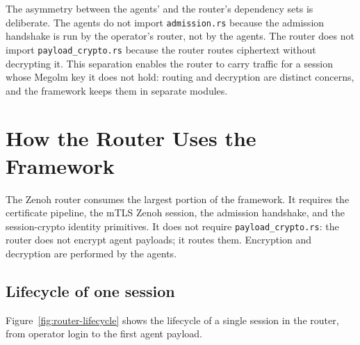 \documentclass[11pt,a4paper]{article}
\begin{document}
The asymmetry between the agents' and the router's dependency
sets is deliberate. The agents do not import
\texttt{admission.rs} because the admission handshake is run by
the operator's router, not by the agents. The router does not
import \texttt{payload\_crypto.rs} because the router routes
ciphertext without decrypting it. This separation enables the
router to carry traffic for a session whose Megolm key it does
not hold: routing and decryption are distinct concerns, and the
framework keeps them in separate modules.

\section{How the Router Uses the Framework}
\label{sec:howRouterUses}

The Zenoh router consumes the largest portion of the framework.
It requires the certificate pipeline, the mTLS Zenoh session, the
admission handshake, and the session-crypto identity primitives.
It does not require \texttt{payload\_crypto.rs}: the router does
not encrypt agent payloads; it routes them. Encryption and
decryption are performed by the agents.

\subsection{Lifecycle of one session}

Figure~\ref{fig:router-lifecycle} shows the lifecycle of a single
session in the router, from operator login to the first agent
payload.
\end{document}
